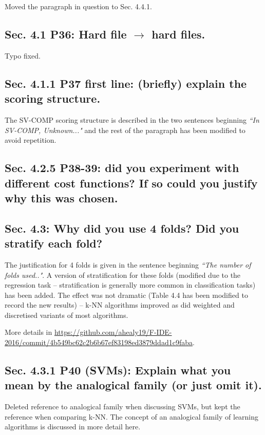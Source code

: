 \documentclass[]{article}
\begin{document}
Moved the paragraph in question to Sec. 4.4.1.

\subsection{Sec. 4.1 P36: Hard file $\rightarrow$ hard files.}

Typo fixed.

\subsection{Sec. 4.1.1 P37 first line: (briefly) explain the scoring structure.}

The SV-COMP scoring structure is described in the two sentences beginning \emph{``In SV-COMP, Unknown..."} and the rest of the paragraph has been modified to avoid repetition. 

\subsection{Sec. 4.2.5 P38-39: did you experiment with different cost functions? If so could you justify why this was chosen.}

\subsection{Sec. 4.3: Why did you use 4 folds? Did you stratify each fold?}

The justification for 4 folds is given in the sentence beginning \emph{``The number of folds used.."}. A version of stratification for these folds (modified due to the regression task -- stratification is generally more common in classification tasks) has been added. The effect was not dramatic (Table 4.4 has been modified to record the new results) -- k-NN algorithms improved as did weighted and discretised variants of most algorithms.

\sloppypar
More details in \url{https://github.com/ahealy19/F-IDE-2016/commit/4b549bc62c2b6b67ef83198ed3879ddad1c9faba}. 

\subsection{Sec. 4.3.1 P40 (SVMs): Explain what you mean by the analogical family (or just omit it).}

Deleted reference to analogical family when discussing SVMs, but kept the reference when comparing k-NN. 
The concept of an analogical family of learning algorithms is discussed in more detail here.
\end{document}
